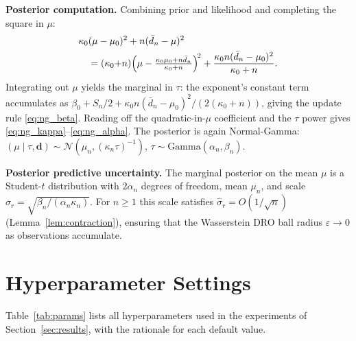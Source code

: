 \documentclass[11pt]{article}
\theoremstyle{definition}
\theoremstyle{remark}
\begin{document}
\textbf{Posterior computation.}
Combining prior and likelihood and completing the square in $\mu$:
\begin{align*}
&\kappa_0(\mu-\mu_0)^2 + n(\bar{d}_n - \mu)^2 \\
&\quad= (\kappa_0{+}n)\Bigl(\mu - \tfrac{\kappa_0\mu_0+n\bar{d}_n}{\kappa_0+n}\Bigr)^{\!2}
  + \frac{\kappa_0 n(\bar{d}_n-\mu_0)^2}{\kappa_0+n}.
\end{align*}
Integrating out $\mu$ yields the marginal in $\tau$:
the exponent's constant term accumulates as
$\beta_0 + S_n/2 + \kappa_0 n(\bar{d}_n-\mu_0)^2/(2(\kappa_0+n))$,
giving the update rule \eqref{eq:ng_beta}.
Reading off the quadratic-in-$\mu$ coefficient and the $\tau$ power
gives \eqref{eq:ng_kappa}--\eqref{eq:ng_alpha}.
The posterior is again Normal-Gamma:
$(\mu\mid\tau,\mathbf{d}) \sim \mathcal{N}(\mu_n, (\kappa_n\tau)^{-1})$,
$\tau \sim \mathrm{Gamma}(\alpha_n,\beta_n)$.

\textbf{Posterior predictive uncertainty.}
The marginal posterior on the mean $\mu$ is a Student-$t$ distribution with
$2\alpha_n$ degrees of freedom, mean $\mu_n$, and scale
$\hat\sigma_r = \sqrt{\beta_n/(\alpha_n\kappa_n)}$.
For $n \geq 1$ this scale satisfies $\hat\sigma_r = O(1/\sqrt{n})$
(Lemma~\ref{lem:contraction}), ensuring that the Wasserstein DRO ball
radius $\varepsilon \to 0$ as observations accumulate.

\section{Hyperparameter Settings}
\label{app:params}

Table~\ref{tab:params} lists all hyperparameters used in the experiments
of Section~\ref{sec:results}, with the rationale for each default value.
\end{document}
